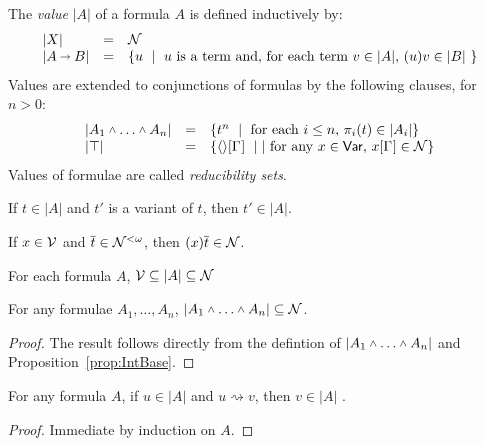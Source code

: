 \documentclass[orivec]{llncs}
\begin{document}
\begin{ALdefinition}
The \emph{value} $|A|$ of a formula $A$ is defined inductively by:
\[
\begin{array}{lll}
|X| & = & \mathcal{N}
\\
|A\vlim B| & = & \mbox{\{$u$ \;|\;  $u$ is a term and, for each term $v\in |A|$, $(u)v \in |B|$ \}}
\end{array}
\]
Values are extended to conjunctions of formulas by the following clauses, for $n>0$:
\[
\begin{array}{lll}
|A_1\vlan\dots\vlan A_n| & = & \mbox{\{$t^n$ \;|\; for each $i\leq n$, $\pi_i(t) \in |A_i|$\}}
\\
|\top| & = & \mbox{\{$\tup*{}\G$ \;|\;| for any $x\in\Var$, $x\G\in\SN$\}}
\end{array}
\]
Values of formulae are called {\em reducibility sets}. \\
\end{ALdefinition}


\begin{remark}
If $t\in|A|$ and $t'$ is a variant of $t$, then $t'\in|A|$.
\end{remark}

\begin{ALlemma}\label{lem:HeadVar}
If $x\in \mathcal{V}$ and $\overline{t} \in \mathcal{N}^{<\omega}$, then
$(x)\overline{t} \in \mathcal{N}$.
\end{ALlemma}

\begin{ALproposition}\label{prop:IntBase}
For each formula $A$, $\mathcal{V} \subseteq |A| \subseteq  \mathcal{N}$
\end{ALproposition}

\begin{ALproposition}
 For any formulae $A_1,\dots,A_n$, $|A_1\vlan\dots\vlan A_n| \subseteq \SN$.
\end{ALproposition}

\begin{proof}
The result follows directly from the defintion of  $|A_1\vlan\dots\vlan A_n|$ and Proposition~\ref{prop:IntBase}.
\end{proof}

\begin{ALlemma}\label{lem:RedStab}
For any formula $A$,  if $u\in |A|$ and $u \rightsquigarrow v$, then $v \in |A|$ .
\end{ALlemma}

\begin{proof}
 Immediate by induction on $A$.
\end{proof}
\end{document}
